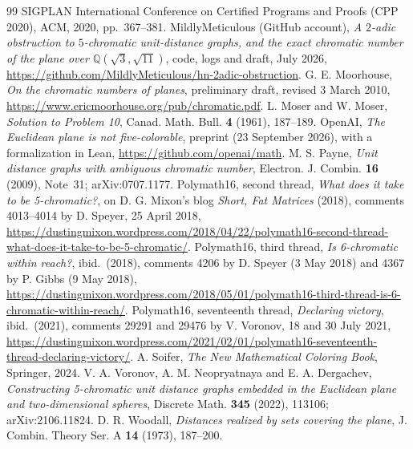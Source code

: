 \documentclass[11pt,a4paper]{amsart}
\theoremstyle{remark}
\newcommand{\Q}{\mathbb{Q}}
\begin{document}
\begin{thebibliography}{99}
SIGPLAN International Conference on Certified Programs and Proofs (CPP 2020), ACM, 2020, pp.~367--381.
 MildlyMeticulous (GitHub account), \emph{A $2$-adic obstruction to $5$-chromatic unit-distance
graphs, and the exact chromatic number of the plane over $\Q(\sqrt3,\sqrt{11})$}, code, logs and draft, July 2026,
\url{https://github.com/MildlyMeticulous/hn-2adic-obstruction}.
 G. E. Moorhouse, \emph{On the chromatic numbers of planes}, preliminary draft, revised
3 March 2010, \url{https://www.ericmoorhouse.org/pub/chromatic.pdf}.
 L. Moser and W. Moser, \emph{Solution to Problem 10}, Canad. Math. Bull. \textbf{4} (1961),
187--189.
 OpenAI, \emph{The Euclidean plane is not five-colorable}, preprint (23 September 2026), with a
formalization in Lean, \url{https://github.com/openai/math}.
 M. S. Payne, \emph{Unit distance graphs with ambiguous chromatic number}, Electron. J. Combin.
\textbf{16} (2009), Note~31; arXiv:0707.1177.
 Polymath16, second thread, \emph{What does it take to be 5-chromatic?}, on D. G. Mixon's
blog \emph{Short, Fat Matrices} (2018), comments 4013--4014 by D. Speyer, 25 April 2018,
\url{https://dustingmixon.wordpress.com/2018/04/22/polymath16-second-thread-what-does-it-take-to-be-5-chromatic/}.
 Polymath16, third thread, \emph{Is 6-chromatic within reach?}, ibid.\ (2018), comments 4206
by D. Speyer (3 May 2018) and 4367 by P. Gibbs (9 May 2018),
\url{https://dustingmixon.wordpress.com/2018/05/01/polymath16-third-thread-is-6-chromatic-within-reach/}.
 Polymath16, seventeenth thread, \emph{Declaring victory}, ibid.\ (2021), comments 29291 and
29476 by V. Voronov, 18 and 30 July 2021,
\url{https://dustingmixon.wordpress.com/2021/02/01/polymath16-seventeenth-thread-declaring-victory/}.
 A. Soifer, \emph{The New Mathematical Coloring Book}, Springer, 2024.
 V. A. Voronov, A. M. Neopryatnaya and E. A. Dergachev, \emph{Constructing 5-chromatic unit distance
graphs embedded in the Euclidean plane and two-dimensional spheres}, Discrete Math. \textbf{345} (2022), 113106;
arXiv:2106.11824.
 D. R. Woodall, \emph{Distances realized by sets covering the plane}, J. Combin. Theory Ser. A
\textbf{14} (1973), 187--200.
\end{thebibliography}
\end{document}
